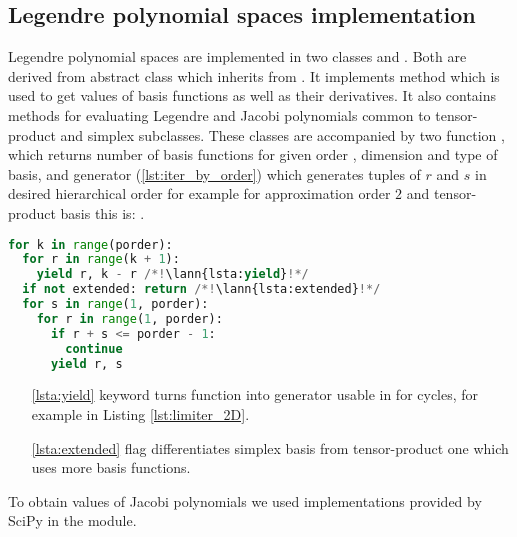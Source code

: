 \subsection{Legendre polynomial spaces implementation}
Legendre polynomial spaces are implemented in two classes 
 and 
. Both are derived from abstract class 
 which inherits from \sfepy{} 
. It implements method  which is used to get values of basis 
functions as well as their derivatives. It also contains methods for evaluating Legendre and Jacobi 
polynomials common to tensor-product and simplex subclasses. These classes are accompanied by two 
function , which returns number of basis functions for given order , dimension 
and type of basis, and generator  (\ref{lst:iter_by_order}) which generates 
tuples of $r$ and $s$ in desired hierarchical order for example for approximation order $2$ and 
tensor-product basis this is: 
. 
\setcounter{lstannotation}{0}
\begin{lstlisting}[language=Python, caption= Iteration over $r$ and $s$ 
indicies of basis functions \label{lst:iter_by_order}]
for k in range(porder):
  for r in range(k + 1):
    yield r, k - r /*!\lann{lsta:yield}!*/
  if not extended: return /*!\lann{lsta:extended}!*/
  for s in range(1, porder):
    for r in range(1, porder):
      if r + s <= porder - 1:
        continue
      yield r, s
\end{lstlisting}
\begin{itemize}
    \item[\ref{lsta:yield}]  keyword turns function into generator usable in for 
    cycles, for example in Listing \ref{lst:limiter_2D}.
    \item[\ref{lsta:extended}]  flag differentiates simplex basis from 
    tensor-product one which uses more basis functions.
\end{itemize}
To obtain values of Jacobi polynomials we used implementations provided by SciPy in the 
 module.

